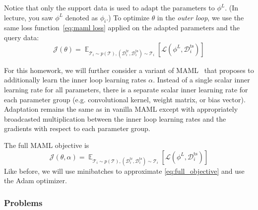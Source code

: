 \documentclass[12pt]{article}
\DeclareMathOperator{\E}{\mathbb{E}}
\newcommand{\task}{\mathcal{T}}
\newcommand{\supportdata}{\mathcal{D}^\mathrm{tr}}
\newcommand{\querydata}{\mathcal{D}^\mathrm{ts}}
\begin{document}
Notice that only the support data is used to adapt the parameters to $\phi^L$. (In lecture, you saw $\phi^L$ denoted as $\phi_i$.) To optimize $\theta$ in the \emph{outer loop}, we use the same loss function~\eqref{eq:maml loss} applied on the adapted parameters and the query data:
\begin{equation}
    \mathcal{J}(\theta) = \E_{\task_i \sim p(\task), (\supportdata_i, \querydata_i) \sim \task_i} \left[ \mathcal{L}(\phi^L, \querydata_i) \right] \label{eq:maml_objective}
\end{equation}


For this homework, we will further consider a variant of MAML~\cite{mamlplusplus} that proposes to additionally learn the inner loop learning rates $\alpha$. Instead of a single scalar inner learning rate for all parameters, there is a separate scalar inner learning rate for each parameter group (e.g. convolutional kernel, weight matrix, or bias vector). Adaptation remains the same as in vanilla MAML except with appropriately broadcasted multiplication between the inner loop learning rates and the gradients with respect to each parameter group. 

The full MAML objective is
\begin{equation}
    \mathcal{J}(\theta, \alpha) = \E_{\task_i \sim p(\task), (\supportdata_i, \querydata_i) \sim \task_i} \left[ \mathcal{L}(\phi^L, \querydata_i) \right] \label{eq:full_objective}
\end{equation}
Like before, we will use minibatches to approximate \eqref{eq:full_objective} and use the Adam optimizer.

\subsubsection*{Problems}
\end{document}

